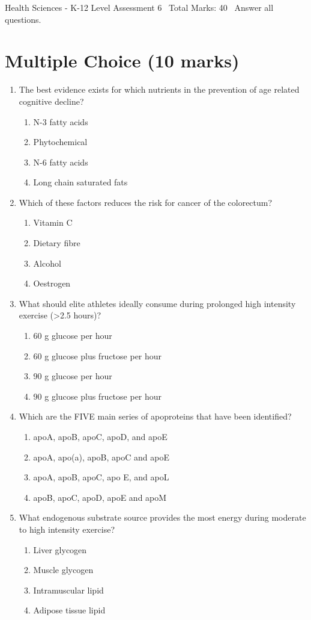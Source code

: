 \documentclass[12pt]{article}
\begin{document}
\begin{center}
Health Sciences - K-12 Level Assessment 6 \
Total Marks: 40 \
Answer all questions.
\end{center}

\section*{Multiple Choice (10 marks)}
\begin{enumerate}[label=\arabic*.]
\item The best evidence exists for which nutrients in the prevention of age related cognitive decline?
\begin{enumerate}[label=(\alph*)]
    \item N-3 fatty acids
    \item Phytochemical
    \item N-6 fatty acids
    \item Long chain saturated fats
\end{enumerate}
\item Which of these factors reduces the risk for cancer of the colorectum?
\begin{enumerate}[label=(\alph*)]
    \item Vitamin C
    \item Dietary fibre
    \item Alcohol
    \item Oestrogen
\end{enumerate}
\item What should elite athletes ideally consume during prolonged high intensity exercise (\textgreater{}2.5 hours)?
\begin{enumerate}[label=(\alph*)]
    \item 60 g glucose per hour
    \item 60 g glucose plus fructose per hour
    \item 90 g glucose per hour
    \item 90 g glucose plus fructose per hour
\end{enumerate}
\item Which are the FIVE main series of apoproteins that have been identified?
\begin{enumerate}[label=(\alph*)]
    \item apoA, apoB, apoC, apoD, and apoE
    \item apoA, apo(a), apoB, apoC and apoE
    \item apoA, apoB, apoC, apo E, and apoL
    \item apoB, apoC, apoD, apoE and apoM
\end{enumerate}
\item What endogenous substrate source provides the most energy during moderate to high intensity exercise?
\begin{enumerate}[label=(\alph*)]
    \item Liver glycogen
    \item Muscle glycogen
    \item Intramuscular lipid
    \item Adipose tissue lipid
\end{enumerate}
\end{enumerate}
\end{document}
